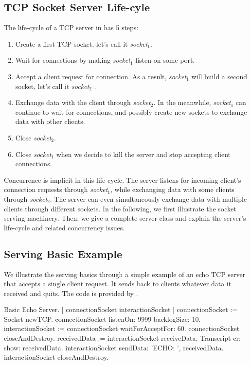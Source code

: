 \documentclass[a4paper,10pt,twoside]{book}
\begin{document}
\subsection{TCP Socket Server Life-cyle}
The life-cycle of a TCP server in \pharo  has 5 steps:
\begin{enumerate}
\item Create a first TCP socket, let's call it \textit{socket$_1$}.
\item Wait for connections by making \textit{socket$_1$}  listen on some port.
\item Accept a client request for connection. As a result,  \textit{socket$_1$} will build a second socket, let's call it \textit{socket$_2$} .
\item Exchange data with the client through \textit{socket$_2$}. In the meanwhile, \textit{socket$_1$} can continue to wait for connections, and possibly create new sockets to exchange data with other clients. 
\item Close \textit{socket$_2$}.
\item Close \textit{socket$_1$} when we decide to kill the server and stop accepting client connections.
\end{enumerate}

Concurrence is implicit in this life-cycle.
The server listens for incoming client's connection requests through \textit{socket$_1$}, while exchanging data with some clients through \textit{socket$_2$}.
The server can even simultaneously exchange data with multiple clients through different sockets.
In the following, we first illustrate the socket serving machinery.
Then, we give a complete server class and explain the server's life-cycle and related concurrency issues.

\subsection{Serving Basic Example}
We illustrate the serving basics through a simple example of an echo TCP server that accepts a single client request.
It sends back to clients whatever data it received and quits.
The code is provided by .

\begin{script}[servingBasicExample]{Basic Echo Server.}
| connectionSocket interactionSocket |
connectionSocket := Socket newTCP.
connectionSocket listenOn: 9999 backlogSize: 10.
interactionSocket := connectionSocket waitForAcceptFor: 60.
connectionSocket closeAndDestroy.
receivedData := interactionSocket receiveData.
Transcript cr; show: receivedData.
interactionSocket sendData: 'ECHO: ', receivedData.
interactionSocket closeAndDestroy.
\end{script}
\end{document}
